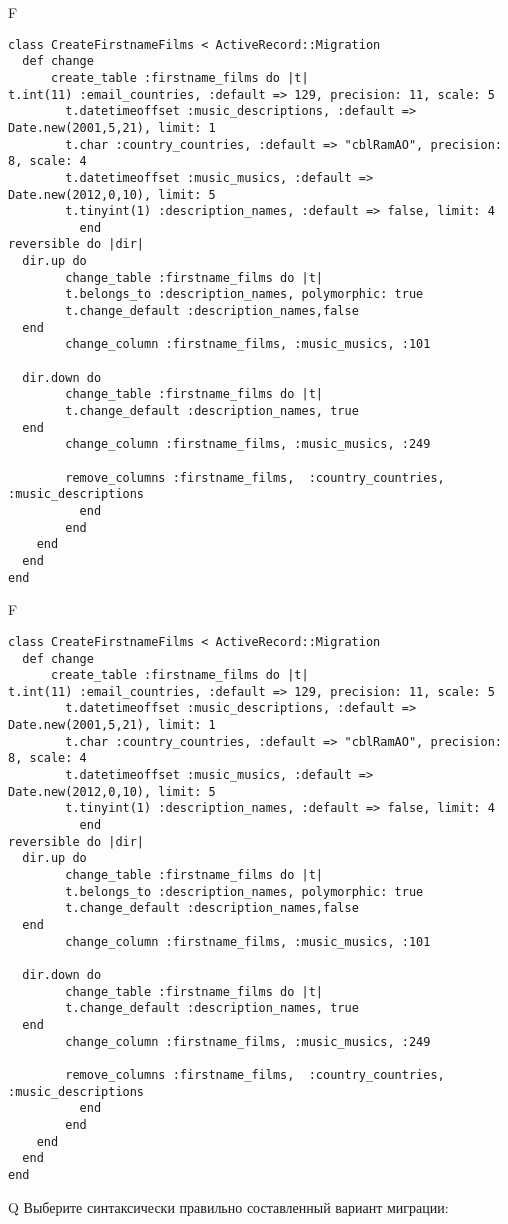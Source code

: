 F
\begin{verbatim}
class CreateFirstnameFilms < ActiveRecord::Migration
  def change
	  create_table :firstname_films do |t|
t.int(11) :email_countries, :default => 129, precision: 11, scale: 5
		t.datetimeoffset :music_descriptions, :default => Date.new(2001,5,21), limit: 1
		t.char :country_countries, :default => "cblRamAO", precision: 8, scale: 4
		t.datetimeoffset :music_musics, :default => Date.new(2012,0,10), limit: 5
		t.tinyint(1) :description_names, :default => false, limit: 4
		  end
reversible do |dir|
  dir.up do
		change_table :firstname_films do |t|
		t.belongs_to :description_names, polymorphic: true
 		t.change_default :description_names,false
  end
 		change_column :firstname_films, :music_musics, :101
   
  dir.down do
		change_table :firstname_films do |t|
		t.change_default :description_names, true
  end
 		change_column :firstname_films, :music_musics, :249
   
		remove_columns :firstname_films,  :country_countries, :music_descriptions 
	      end
	    end
    end 
  end
end

\end{verbatim}

F
\begin{verbatim}
class CreateFirstnameFilms < ActiveRecord::Migration
  def change
	  create_table :firstname_films do |t|
t.int(11) :email_countries, :default => 129, precision: 11, scale: 5
		t.datetimeoffset :music_descriptions, :default => Date.new(2001,5,21), limit: 1
		t.char :country_countries, :default => "cblRamAO", precision: 8, scale: 4
		t.datetimeoffset :music_musics, :default => Date.new(2012,0,10), limit: 5
		t.tinyint(1) :description_names, :default => false, limit: 4
		  end
reversible do |dir|
  dir.up do
		change_table :firstname_films do |t|
		t.belongs_to :description_names, polymorphic: true
 		t.change_default :description_names,false
  end
 		change_column :firstname_films, :music_musics, :101
   
  dir.down do
		change_table :firstname_films do |t|
		t.change_default :description_names, true
  end
 		change_column :firstname_films, :music_musics, :249
   
		remove_columns :firstname_films,  :country_countries, :music_descriptions 
	      end
	    end
    end 
  end
end

\end{verbatim}

Q
Выберите синтаксически правильно составленный вариант миграции:

